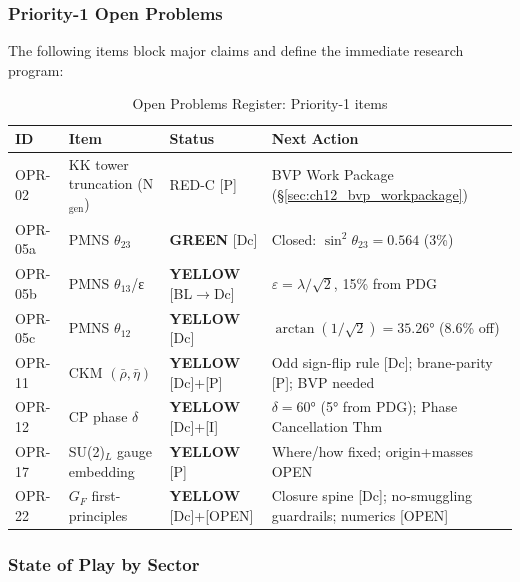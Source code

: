 \subsubsection{Priority-1 Open Problems}

The following items block major claims and define the immediate research program:

\begin{table}[ht]
\centering
\caption{Open Problems Register: Priority-1 items}
\label{tab:opr_p1}
\begin{tabular}{lp{5cm}lp{4cm}}
\toprule
\textbf{ID} & \textbf{Item} & \textbf{Status} & \textbf{Next Action} \\
\midrule
OPR-02 & KK tower truncation (N$_{\text{gen}}$) & RED-C [P] & BVP Work Package (\S\ref{sec:ch12_bvp_workpackage}) \\
OPR-05a & PMNS $\theta_{23}$ & \textcolor{OliveGreen}{\textbf{GREEN}} [Dc] & Closed: $\sin^2\theta_{23} = 0.564$ (3\%) \\
OPR-05b & PMNS $\theta_{13}$/ε & \textcolor{YellowOrange}{\textbf{YELLOW}} [BL$\to$Dc] & $\varepsilon = \lambda/\sqrt{2}$, 15\% from PDG \\
OPR-05c & PMNS $\theta_{12}$ & \textcolor{YellowOrange}{\textbf{YELLOW}} [Dc] & $\arctan(1/\sqrt{2}) = 35.26°$ (8.6\% off) \\
OPR-11 & CKM $(\bar\rho, \bar\eta)$ & \textcolor{YellowOrange}{\textbf{YELLOW}} [Dc]+[P] & Odd sign-flip rule [Dc]; brane-parity [P]; BVP needed \\
OPR-12 & CP phase $\delta$ & \textcolor{YellowOrange}{\textbf{YELLOW}} [Dc]+[I] & $\delta = 60°$ (5° from PDG); Phase Cancellation Thm \\
OPR-17 & SU(2)$_L$ gauge embedding & \textcolor{YellowOrange}{\textbf{YELLOW}} [P] & Where/how fixed; origin+masses OPEN \\
OPR-22 & $G_F$ first-principles & \textcolor{YellowOrange}{\textbf{YELLOW}} [Dc]+[OPEN] & Closure spine [Dc]; no-smuggling guardrails; numerics [OPEN] \\
\bottomrule
\end{tabular}
\end{table}

\subsubsection{State of Play by Sector}

